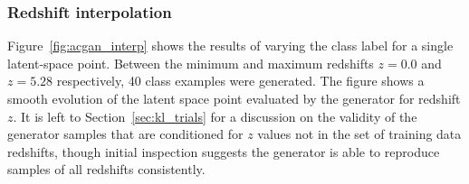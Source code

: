 \documentclass[twocolumn]{article}
\numberwithin{equation}{section}
\begin{document}


\subsubsection{Redshift interpolation}

Figure~\ref{fig:acgan_interp} shows the results of varying the class label for a single latent-space point. Between the 
minimum and maximum redshifts $z=0.0$ and $z=5.28$ respectively, 40 class examples were generated. The figure shows a 
smooth evolution of the latent space point evaluated by the generator for redshift $z$. It is left to Section~\ref{sec:kl_trials} 
for a discussion on the validity of the generator samples that are conditioned for $z$ values not in the set of training 
data redshifts, though initial inspection suggests the generator is able to reproduce samples of all redshifts consistently.
\end{document}
